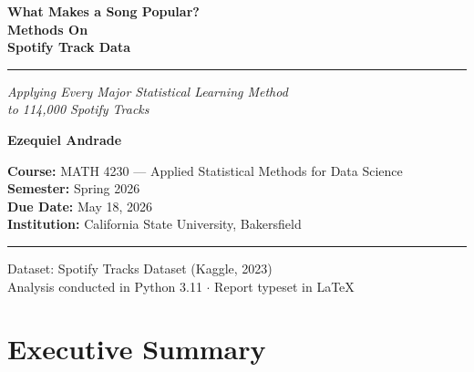 \documentclass[12pt, oneside]{book}
\begin{document}

\frontmatter

\begin{titlepage}
    \centering
    \vspace*{1.5cm}

    {\Huge\bfseries\color{darkgray}
        What Makes a Song Popular?\\[0.4em]
        Methods On\\[0.4em]
        Spotify Track Data
    \par}

    \vspace{0.5cm}
    \noindent\rule{\textwidth}{1.5pt}
    \vspace{0.5cm}

    {\large\itshape
        Applying Every Major Statistical Learning Method\\
        to 114{,}000 Spotify Tracks
    \par}

    {\LARGE\bfseries Ezequiel Andrade\par}

    \vspace{0.8cm}

    {\large
        \textbf{Course:} MATH 4230 --- Applied Statistical Methods for Data Science\\[0.5em]
        \textbf{Semester:} Spring 2026\\[0.5em]
        \textbf{Due Date:} May 18, 2026\\[0.5em]
        \textbf{Institution:} California State University, Bakersfield
    \par}

    \vspace{1.5cm}
    \noindent\rule{\textwidth}{0.5pt}

    \vfill
    {\small\color{gray}
        Dataset: Spotify Tracks Dataset (Kaggle, 2023)\\
        Analysis conducted in Python 3.11 $\cdot$ Report typeset in \LaTeX
    }
\end{titlepage}

\chapter*{Executive Summary}
\end{document}
